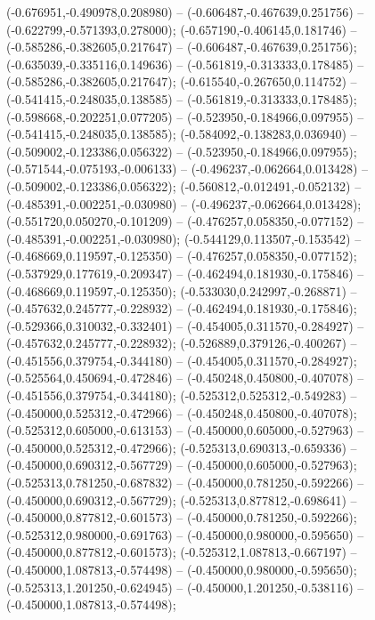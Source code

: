 (-0.676951,-0.490978,0.208980) -- (-0.606487,-0.467639,0.251756) -- (-0.622799,-0.571393,0.278000);
 (-0.657190,-0.406145,0.181746) -- (-0.585286,-0.382605,0.217647) -- (-0.606487,-0.467639,0.251756);
 (-0.635039,-0.335116,0.149636) -- (-0.561819,-0.313333,0.178485) -- (-0.585286,-0.382605,0.217647);
 (-0.615540,-0.267650,0.114752) -- (-0.541415,-0.248035,0.138585) -- (-0.561819,-0.313333,0.178485);
 (-0.598668,-0.202251,0.077205) -- (-0.523950,-0.184966,0.097955) -- (-0.541415,-0.248035,0.138585);
 (-0.584092,-0.138283,0.036940) -- (-0.509002,-0.123386,0.056322) -- (-0.523950,-0.184966,0.097955);
 (-0.571544,-0.075193,-0.006133) -- (-0.496237,-0.062664,0.013428) -- (-0.509002,-0.123386,0.056322);
 (-0.560812,-0.012491,-0.052132) -- (-0.485391,-0.002251,-0.030980) -- (-0.496237,-0.062664,0.013428);
 (-0.551720,0.050270,-0.101209) -- (-0.476257,0.058350,-0.077152) -- (-0.485391,-0.002251,-0.030980);
 (-0.544129,0.113507,-0.153542) -- (-0.468669,0.119597,-0.125350) -- (-0.476257,0.058350,-0.077152);
 (-0.537929,0.177619,-0.209347) -- (-0.462494,0.181930,-0.175846) -- (-0.468669,0.119597,-0.125350);
 (-0.533030,0.242997,-0.268871) -- (-0.457632,0.245777,-0.228932) -- (-0.462494,0.181930,-0.175846);
 (-0.529366,0.310032,-0.332401) -- (-0.454005,0.311570,-0.284927) -- (-0.457632,0.245777,-0.228932);
 (-0.526889,0.379126,-0.400267) -- (-0.451556,0.379754,-0.344180) -- (-0.454005,0.311570,-0.284927);
 (-0.525564,0.450694,-0.472846) -- (-0.450248,0.450800,-0.407078) -- (-0.451556,0.379754,-0.344180);
 (-0.525312,0.525312,-0.549283) -- (-0.450000,0.525312,-0.472966) -- (-0.450248,0.450800,-0.407078);
 (-0.525312,0.605000,-0.613153) -- (-0.450000,0.605000,-0.527963) -- (-0.450000,0.525312,-0.472966);
 (-0.525313,0.690313,-0.659336) -- (-0.450000,0.690312,-0.567729) -- (-0.450000,0.605000,-0.527963);
 (-0.525313,0.781250,-0.687832) -- (-0.450000,0.781250,-0.592266) -- (-0.450000,0.690312,-0.567729);
 (-0.525313,0.877812,-0.698641) -- (-0.450000,0.877812,-0.601573) -- (-0.450000,0.781250,-0.592266);
 (-0.525312,0.980000,-0.691763) -- (-0.450000,0.980000,-0.595650) -- (-0.450000,0.877812,-0.601573);
 (-0.525312,1.087813,-0.667197) -- (-0.450000,1.087813,-0.574498) -- (-0.450000,0.980000,-0.595650);
 (-0.525313,1.201250,-0.624945) -- (-0.450000,1.201250,-0.538116) -- (-0.450000,1.087813,-0.574498);
